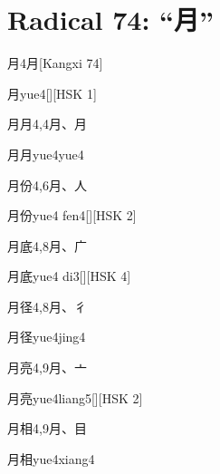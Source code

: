 
\section*{Radical 74: ``⽉''}

\begin{entry}{月}{4}{⽉}[Kangxi 74]
  \begin{phonetics}{月}{yue4}[][HSK 1]
  \end{phonetics}
\end{entry}

\begin{entry}{月月}{4,4}{⽉、⽉}
  \begin{phonetics}{月月}{yue4yue4}
  \end{phonetics}
\end{entry}

\begin{entry}{月份}{4,6}{⽉、⼈}
  \begin{phonetics}{月份}{yue4 fen4}[][HSK 2]
  \end{phonetics}
\end{entry}

\begin{entry}{月底}{4,8}{⽉、⼴}
  \begin{phonetics}{月底}{yue4 di3}[][HSK 4]
  \end{phonetics}
\end{entry}

\begin{entry}{月径}{4,8}{⽉、⼻}
  \begin{phonetics}{月径}{yue4jing4}
  \end{phonetics}
\end{entry}

\begin{entry}{月亮}{4,9}{⽉、⼇}
  \begin{phonetics}{月亮}{yue4liang5}[][HSK 2]
  \end{phonetics}
\end{entry}

\begin{entry}{月相}{4,9}{⽉、⽬}
  \begin{phonetics}{月相}{yue4xiang4}
  \end{phonetics}
\end{entry}

